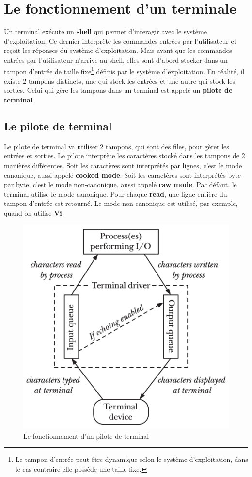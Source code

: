 \section{Le fonctionnement d'un terminale}
Un terminal exécute un \textbf{shell} qui permet d'interagir avec le système d'exploitation. Ce dernier interprète les commandes entrées par l'utilisateur et reçoit les réponses du système d'exploitation.
Mais avant que les commandes entrées par l'utilisateur n'arrive au shell, elles sont d'abord stocker dans un tampon d'entrée de taille fixe\footnote{Le tampon d'entrée peut-être dynamique selon le système d'exploitation, dans le cas contraire elle possède une taille fixe.} définis par le système d'exploitation.
En réalité, il existe 2 tampons distincts, une qui stock les entrées et une autre qui stock les sorties.
Celui qui gère les tampons dans un terminal est appelé un \textbf{pilote de terminal}.

\subsection{Le pilote de terminal}
Le pilote de terminal va utiliser 2 tampons, qui sont des files, pour gèrer les entrées et sorties. Le pilote interprète les caractères stocké dans les tampons de 2 manières différentes.
Soit les caractères sont interprétés par lignes, c'est le mode canonique, aussi appelé \textbf{cooked mode}. Soit les caractères sont interprétés byte par byte, c'est le mode non-canonique, aussi appelé \textbf{raw mode}.
Par défaut, le terminal utilise le mode canonique. Pour chaque \textbf{read}, une ligne entière du tampon d'entrée est retourné.
Le mode non-canonique est utilisé, par exemple, quand on utilise \textbf{Vi}.

\begin{figure}[h]
    \centering
    \includegraphics[width=0.8\linewidth]{images/terminal_driver.png}
    \caption{Le fonctionnement d'un pilote de terminal}
\end{figure}

